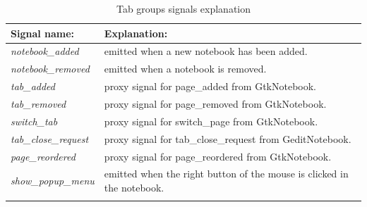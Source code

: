 \begin{table}[H]
  \begin{center}
    \begin{tabularx}{\textwidth}{|l|X|}
      \firsthline
      \textbf{Signal name:} & \textbf{Explanation:} \\
      \hline
      \textit{notebook\_added} & emitted when a new notebook has been added. \\
      \hline
      \textit{notebook\_removed} & emitted when a notebook is removed. \\
      \hline
      \textit{tab\_added} & proxy signal for page\_added from GtkNotebook. \\
      \hline
      \textit{tab\_removed} & proxy signal for page\_removed from GtkNotebook. \\
      \hline
      \textit{switch\_tab} & proxy signal for switch\_page from GtkNotebook. \\
      \hline
      \textit{tab\_close\_request} & proxy signal for tab\_close\_request from GeditNotebook. \\
      \hline
      \textit{page\_reordered} & proxy signal for page\_reordered from GtkNotebook. \\
      \hline
      \textit{show\_popup\_menu} & emitted when the right button of the mouse is clicked in the notebook. \\
      \lasthline
    \end{tabularx}
    \caption{Tab groups signals explanation}
  \end{center}
\end{table}

